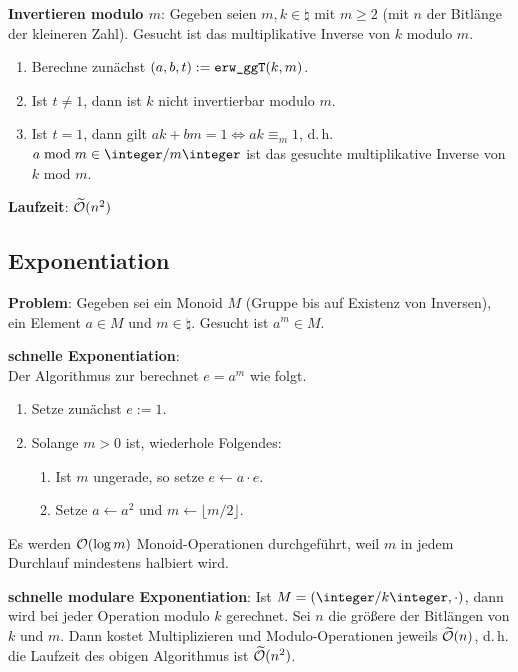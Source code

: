\linie

\textbf{Invertieren modulo $m$}:
Gegeben seien $m, k \in \natural$ mit $m \ge 2$ (mit $n$ der Bitlänge der kleineren Zahl).
Gesucht ist das multiplikative Inverse von $k$ modulo $m$.
\begin{enumerate}
    \item
    Berechne zunächst $(a, b, t) := \texttt{erw\_ggT}(k, m)$.

    \item
    Ist $t \not= 1$, dann ist $k$ nicht invertierbar modulo $m$.

    \item
    Ist $t = 1$, dann gilt $ak + bm = 1 \iff ak \equiv_m 1$,
    d.\,h. $a \bmod m \in \ZmZ$ ist das gesuchte multiplikative Inverse von $k$ mod $m$.
\end{enumerate}

\textbf{Laufzeit}:
$\widetilde{\mathcal{O}}(n^2)$

\pagebreak

\subsection{%
    Exponentiation%
}

\textbf{Problem}:
Gegeben sei ein Monoid $M$ (Gruppe bis auf Existenz von Inversen), ein Element $a \in M$ und
$m \in \natural$.
Gesucht ist $a^m \in M$.

\textbf{schnelle Exponentiation}:\\
Der Algorithmus zur  berechnet $e = a^m$ wie folgt.
\begin{enumerate}
    \item
    Setze zunächst $e := 1$.

    \item
    Solange $m > 0$ ist, wiederhole Folgendes:
    \begin{enumerate}
        \item
        Ist $m$ ungerade, so setze $e \leftarrow a \cdot e$.

        \item
        Setze $a \leftarrow a^2$ und $m \leftarrow \lfloor m/2\rfloor$.
    \end{enumerate}
\end{enumerate}
Es werden $\mathcal{O}(\log m)$ Monoid-Operationen durchgeführt,
weil $m$ in jedem Durchlauf mindestens halbiert wird.

\textbf{schnelle modulare Exponentiation}:
Ist $M = (\ZkZ, \cdot)$, dann wird bei jeder Operation modulo $k$ gerechnet.
Sei $n$ die größere der Bitlängen von $k$ und $m$.
Dann kostet Multiplizieren und Modulo-Operationen jeweils $\widetilde{\mathcal{O}}(n)$,
d.\,h. die Laufzeit des obigen Algorithmus ist $\widetilde{\mathcal{O}}(n^2)$.

